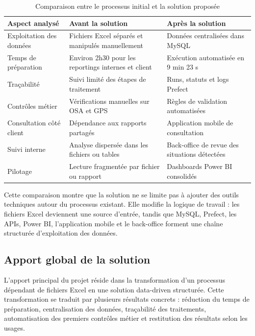 \begin{table}[H]
\centering
\caption{Comparaison entre le processus initial et la solution proposée}
\label{tab:comparaison_avant_apres_solution}
\renewcommand{\arraystretch}{1.15}
\setlength{\tabcolsep}{4pt}
\small
\begin{tabular}{L{4.2cm} L{4.8cm} L{4.8cm}}
\toprule
\textbf{Aspect analysé} & \textbf{Avant la solution} & \textbf{Après la solution} \\
\midrule
Exploitation des données & Fichiers Excel séparés et manipulés manuellement & Données centralisées dans MySQL \\
\addlinespace
Temps de préparation & Environ 2h30 pour les reportings internes et client & Exécution automatisée en 9 min 23 s \\
\addlinespace
Traçabilité & Suivi limité des étapes de traitement & Runs, statuts et logs Prefect \\
\addlinespace
Contrôles métier & Vérifications manuelles sur OSA et GPS & Règles de validation automatisées \\
\addlinespace
Consultation côté client & Dépendance aux rapports partagés & Application mobile de consultation \\
\addlinespace
Suivi interne & Analyse dispersée dans les fichiers ou tables & Back-office de revue des situations détectées \\
\addlinespace
Pilotage & Lecture fragmentée par fichier ou rapport & Dashboards Power BI consolidés \\
\bottomrule
\end{tabular}
\end{table}

Cette comparaison montre que la solution ne se limite pas à ajouter des outils techniques autour du processus existant. Elle modifie la logique de travail : les fichiers Excel deviennent une source d’entrée, tandis que MySQL, Prefect, les APIs, Power BI, l’application mobile et le back-office forment une chaîne structurée d’exploitation des données.

\subsection{Apport global de la solution}

L’apport principal du projet réside dans la transformation d’un processus dépendant de fichiers Excel en une solution data-driven structurée. Cette transformation se traduit par plusieurs résultats concrets : réduction du temps de préparation, centralisation des données, traçabilité des traitements, automatisation des premiers contrôles métier et restitution des résultats selon les usages.

